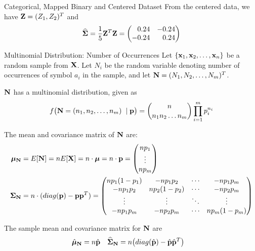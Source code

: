 \begin{frame}{Categorical, Mapped Binary and Centered Dataset}
	From the centered data, we have $\mathbf{Z} = (Z_1, Z_2)^T$ and
    \begin{align*}
	  \hcov = {1 \over 5}\bZ^T\bZ = \amatr{r}{0.24 & -0.24\\-0.24 & 0.24}
    \end{align*}
\end{frame}


\begin{frame}{Multinomial Distribution: Number of Occurrences}
  \small
Let $\{\mathbf{x}_1, \mathbf{x}_2, \dots, \mathbf{x}_n\}$ be a random sample from $\mathbf{X}$.
Let $N_i$ be the random variable denoting number of
occurrences of symbol $a_i$ in the sample, and
let $\mathbf{N} = (N_1, N_2, \dots, N_m)^T$.

$\mathbf{N}$ has a
multinomial distribution, given as
\begin{align*}
    f\bigl(\mathbf{N} = (n_1,n_2,\dots,n_m)\;\; |\; \mathbf{p}\bigr)  =
    {n \choose n_1 n_2 \dots n_m} \prod_{i=1}^m p_i^{n_i}
\end{align*}

The mean and covariance matrix of $\mathbf{N}$ are:
\begin{align*}
    \bmu_\bN & = E[\bN] = n E[\bX] = n \cdot \bmu = n \cdot \bp =
    \matr{n p_1\\ \vdots\\n p_m}\\
    \cov_\bN & = n \cdot (diag(\bp) - \bp\bp^T) =
    \amatr{c}{n p_1(1-p_1) & -n p_1p_2 & \cdots & -n p_1p_m\\
    -n p_1p_2 & n p_2(1-p_2) & \cdots & -n p_2p_m\\
    \vdots & \vdots & \ddots & \vdots\\
    -n p_1p_m & -n p_2p_m & \cdots & n p_m(1-p_m)\\
    }
\end{align*}

The sample mean and covariance matrix for $\mathbf{N}$ are
\begin{align*}
    \hat{{\bm \mu}}_{\mathbf{N}} & = n \hat{\mathbf{p}} & \widehat{{\bm \Sigma}}_{\mathbf{N}} &= n \bigl(diag(\hat{\mathbf{p}}) - \hat{\mathbf{p}} \hat{\mathbf{p}}^T\bigr)
\end{align*}
\end{frame}


